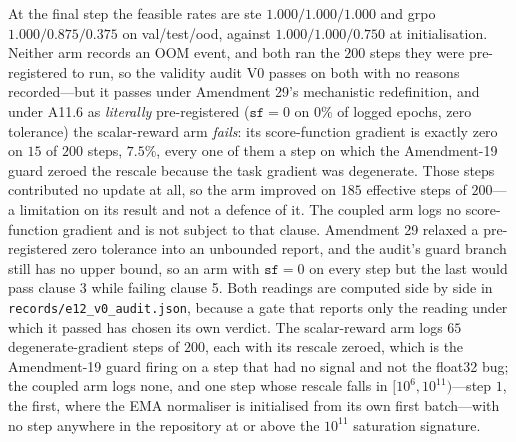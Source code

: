 \documentclass{article}
\begin{document}
At the final step the feasible rates are ste $1.000/1.000/1.000$ and grpo
$1.000/0.875/0.375$ on val/test/ood, against $1.000/1.000/0.750$ at initialisation.
Neither arm records an OOM event, and both ran the $200$ steps they were
pre-registered to run, so the validity audit V0 passes on both with no reasons recorded---but it
passes under Amendment 29's mechanistic redefinition, and under A11.6 as \emph{literally}
pre-registered ($\texttt{sf} = 0$ on $0\%$ of logged epochs, zero tolerance) the scalar-reward arm
\emph{fails}: its score-function gradient is exactly zero on $15$ of $200$ steps, $7.5\%$, every one
of them a step on which the Amendment-19 guard zeroed the rescale because the task gradient was
degenerate.  Those steps contributed no update at all, so the arm improved on $185$ effective steps
of $200$---a limitation on its result and not a defence of it.  The coupled arm logs no
score-function gradient and is not subject to that clause.  Amendment 29 relaxed a pre-registered
zero tolerance into an unbounded report, and the audit's guard branch still has no upper bound, so
an arm with $\texttt{sf} = 0$ on every step but the last would pass clause 3 while failing clause 5.
Both readings are computed side by side in \texttt{records/e12\_v0\_audit.json}, because a gate that
reports only the reading under which it passed has chosen its own verdict.  The scalar-reward arm logs
$65$ degenerate-gradient steps of $200$, each with its rescale zeroed, which is the
Amendment-19 guard firing on a step that had no signal and not the float32 bug; the coupled arm
logs none, and one step whose rescale falls in $[10^6, 10^{11})$---step $1$, the
first, where the EMA normaliser is initialised from its own first batch---with no step anywhere in
the repository at or above the $10^{11}$ saturation signature.
\end{document}
